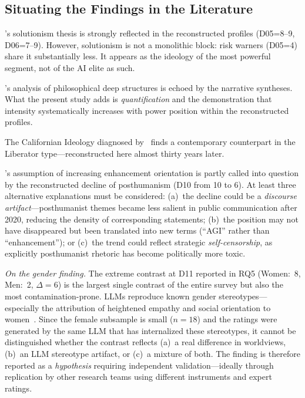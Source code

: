 \documentclass[12pt,a4paper]{article}
\begin{document}
\subsection{Situating the Findings in the Literature}
\label{sec:diskussion:einordnung}

\citeauthor{Morozov2013}'s solutionism thesis is strongly reflected in the reconstructed profiles (D05=8--9, D06=7--9). However, solutionism is not a monolithic block: risk warners (D05=4) share it substantially less. It appears as the ideology of the most powerful segment, not of the AI elite as such.

\citeauthor{Daub2020}'s analysis of philosophical deep structures is echoed by the narrative syntheses. What the present study adds is \emph{quantification} and the demonstration that intensity systematically increases with power position within the reconstructed profiles.

The Californian Ideology diagnosed by~\citet{BarbCam1996} finds a contemporary counterpart in the Liberator type---reconstructed here almost thirty years later.

\citeauthor{Coeckelbergh2020}'s assumption of increasing enhancement orientation is partly called into question by the reconstructed decline of posthumanism (D10 from 10 to 6). At least three alternative explanations must be considered: (a)~the decline could be a \emph{discourse artifact}---posthumanist themes became less salient in public communication after 2020, reducing the density of corresponding statements; (b)~the position may not have disappeared but been translated into new terms (``AGI'' rather than ``enhancement''); or (c)~the trend could reflect strategic \emph{self-censorship}, as explicitly posthumanist rhetoric has become politically more toxic.

\emph{On the gender finding.} The extreme contrast at D11 reported in RQ5 (Women:~8, Men:~2, $\Delta = 6$) is the largest single contrast of the entire survey but also the most contamination-prone. LLMs reproduce known gender stereotypes---especially the attribution of heightened empathy and social orientation to women~\citep{Santurkar2023}. Since the female subsample is small ($n = 18$) and the ratings were generated by the same LLM that has internalized these stereotypes, it cannot be distinguished whether the contrast reflects (a)~a real difference in worldviews, (b)~an LLM stereotype artifact, or (c)~a mixture of both. The finding is therefore reported as a \emph{hypothesis} requiring independent validation---ideally through replication by other research teams using different instruments and expert ratings.
\end{document}
